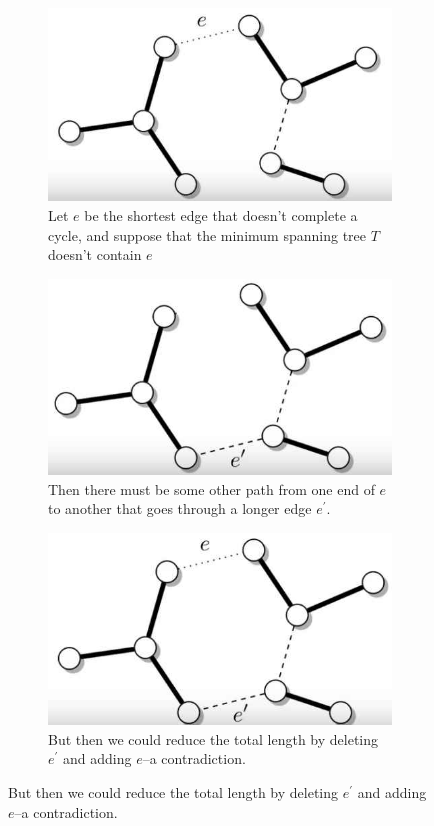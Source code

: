 \documentclass[]{article}
\begin{document}
\begin{figure}[H]
	\caption{How do we know Figure \ref{fig:mst4} is minimal?}
	\begin{subfigure}[b]{0.30\textwidth}
		\caption{Let $e$ be the shortest edge that doesn't complete a cycle, and suppose that the minimum spanning tree $T$ doesn't contain $e$}
		\includegraphics[width=\textwidth]{mst5}
	\end{subfigure}
	\;\;\;
	\begin{subfigure}[b]{0.30\textwidth}
		\caption{Then there must be some other path from one end of $e$ to another that goes through a longer edge $e^\prime$.}
		\includegraphics[width=\textwidth]{mst6}
	\end{subfigure}
	\;\;\;
	\begin{subfigure}[b]{0.30\textwidth}
		\caption{But then we could reduce the total length by deleting $e^\prime$ and adding $e$--a contradiction.}
		\includegraphics[width=\textwidth]{mst7}
	\end{subfigure}
\end{figure}
\end{document}
